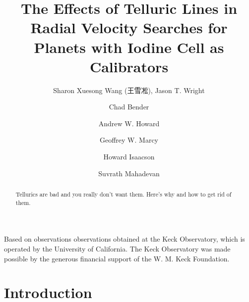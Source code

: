 \documentclass{emulateapj}
\begin{document}

\begin{CJK*}{UTF8}{gbsn}

\title
{
The Effects of Telluric Lines in Radial Velocity Searches for Planets with Iodine
Cell as Calibrators
}

{
Based on observations observations obtained at the Keck Observatory, which is operated
by the University of California.  The Keck Observatory was made
possible by the generous financial support of the W. M. Keck
Foundation.
}

\author{Sharon Xuesong Wang (王雪凇),
  Jason T. Wright} %
\author{Chad Bender} %
\author{Andrew W. Howard} %
\author{Geoffrey W. Marcy} %
\author{Howard Isaacson} %
\author{Suvrath Mahadevan} %







\begin{abstract}

Tellurics are bad and you really don't want them. Here's why and how to get
rid of them.

\end{abstract}



\section{Introduction}\label{sec:intro}


\end{CJK*}
\end{document}
